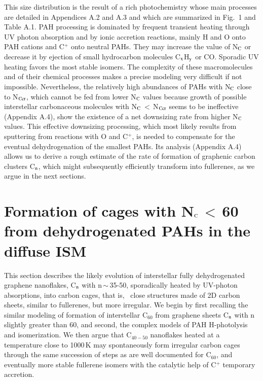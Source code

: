 \documentclass{aa}
\begin{document}
This size distribution is the result of a rich photochemistry whose main processes are detailed in Appendices A.2 and A.3 and which are summarized in Fig.\ 1 
and Table A.1. PAH processing is dominated by frequent transient heating through UV photon absorption and by ionic accretion reactions, mainly H 
and O onto PAH cations and C$^+$ onto neutral PAHs. They may increase the 
value of N$_{\rm C}$ or decrease it by ejection of small hydrocarbon molecules C$_{\rm x}$H$_{\rm y}$ or CO. Sporadic UV heating favors the most stable isomers. The complexity of these macromolecules and of their chemical processes makes a precise modeling very difficult if not impossible.  Nevertheless, the relatively high abundances of PAHs with N$_{\rm C}$ close to N$_{\rm Ccr}$, which cannot be  fed from lower N$_{\rm C}$ values because growth of possible interstellar carbonaceous molecules with  N$_{\rm C}$\,$<$\,N$_{\rm Ccr}$ seems to be ineffective (Appendix A.4),  show the existence of a net downsizing rate from higher N$_{\rm C}$ values. 
This effective downsizing processing, which most likely results from sputtering from reactions with O and C$^+$, is needed to compensate for the eventual dehydrogenation of the smallest PAHs.
Its analysis (Appendix A.4) allows us to derive a rough estimate of the rate of formation of graphenic carbon clusters C$_{\rm n}$, which might subsequently efficiently transform into fullerenes, as we argue in the next 
sections. 


\section{Formation of cages with N$_{\rm C}$\,$<$\,60  from dehydrogenated PAHs in the diffuse ISM}

This section describes the likely evolution of interstellar fully 
dehydrogenated graphene nanoflakes,  C$_{\rm n}$ 
with n\,$\sim$\,35-50, sporadically heated by UV-photon absorptions, into carbon cages, that is, \ close structures made of 2D carbon sheets, similar to 
fullerenes, but more irregular. We begin by first recalling the similar 
modeling of formation of interstellar C$_{60}$  from graphene sheets C$_{\rm n}$ with n slightly greater than 60, and second, the complex models 
of PAH H-photolysis and isomerization. We then argue that C$_{40-50}$ 
nanoflakes heated at a temperature close to 1000\,K may spontaneously form irregular carbon cages through the same succession of steps as are well documented for C$_{60}$, and eventually more stable fullerene isomers with the catalytic help of C$^+$ temporary accretion. 
\end{document}
